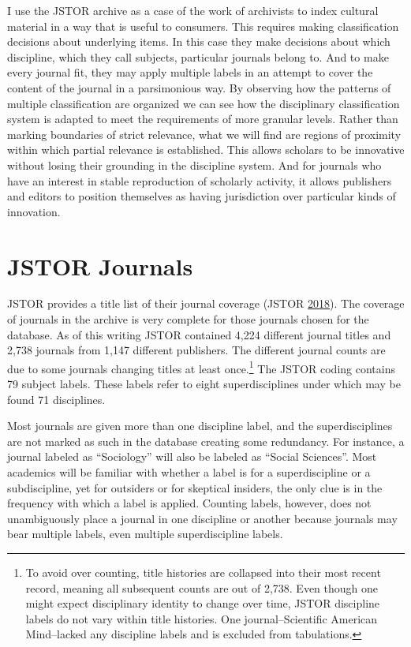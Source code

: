 \documentclass[]{book}
\let\rmarkdownfootnote\footnote%
\def\footnote{\protect\rmarkdownfootnote}
\theoremstyle{definition}
\theoremstyle{definition}
\theoremstyle{definition}
\theoremstyle{remark}
\begin{document}
I use the JSTOR archive as a case of the work of archivists to index
cultural material in a way that is useful to consumers. This requires
making classification decisions about underlying items. In this case
they make decisions about which discipline, which they call subjects,
particular journals belong to. And to make every journal fit, they may
apply multiple labels in an attempt to cover the content of the journal
in a parsimonious way. By observing how the patterns of multiple
classification are organized we can see how the disciplinary
classification system is adapted to meet the requirements of more
granular levels. Rather than marking boundaries of strict relevance,
what we will find are regions of proximity within which partial
relevance is established. This allows scholars to be innovative without
losing their grounding in the discipline system. And for journals who
have an interest in stable reproduction of scholarly activity, it allows
publishers and editors to position themselves as having jurisdiction
over particular kinds of innovation.

\hypertarget{kd-dq1}{%
\section{JSTOR Journals}\label{kd-dq1}}

JSTOR provides a title list of their journal coverage (JSTOR
\protect\hyperlink{ref-JSTOR2018Title}{2018}). The coverage of journals
in the archive is very complete for those journals chosen for the
database. As of this writing JSTOR contained 4,224 different journal
titles and 2,738 journals from 1,147 different publishers. The different
journal counts are due to some journals changing titles at least
once.\footnote{To avoid over counting, title histories are collapsed
  into their most recent record, meaning all subsequent counts are out
  of 2,738. Even though one might expect disciplinary identity to change
  over time, JSTOR discipline labels do not vary within title histories.
  One journal--Scientific American Mind--lacked any discipline labels
  and is excluded from tabulations.} The JSTOR coding contains 79
subject labels. These labels refer to eight superdisciplines under which
may be found 71 disciplines.

Most journals are given more than one discipline label, and the
superdisciplines are not marked as such in the database creating some
redundancy. For instance, a journal labeled as ``Sociology'' will also
be labeled as ``Social Sciences''. Most academics will be familiar with
whether a label is for a superdiscipline or a subdiscipline, yet for
outsiders or for skeptical insiders, the only clue is in the frequency
with which a label is applied. Counting labels, however, does not
unambiguously place a journal in one discipline or another because
journals may bear multiple labels, even multiple superdiscipline labels.
\end{document}
